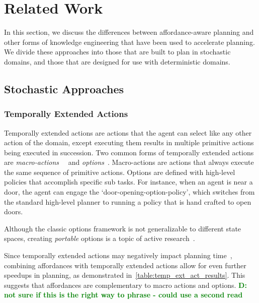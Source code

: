 \documentclass[conference]{IEEEtran}
\newcommand{\dnote}[1]{\textcolor{Green}{\textbf{D: #1}}}
\begin{document}
\section{Related Work}
\label{sec:related-work}

In this section, we discuss the differences between
affordance-aware planning and other forms of knowledge engineering that
have been used to accelerate planning. We divide these approaches
into those that are built to plan in stochastic domains, and those that are
designed for use with deterministic domains.

\subsection{Stochastic Approaches}

\subsubsection{Temporally Extended Actions}
Temporally extended actions are actions that the agent can
select like any other action of the domain, except executing them
results in multiple primitive actions being executed in
succession. Two common forms of temporally extended actions are {\em
  macro-actions}~\cite{hauskrecht98} ~and {\em options}~\cite{sutton99}. 
Macro-actions are actions that always
execute the same sequence of primitive actions. Options are defined
with high-level policies that accomplish specific sub tasks. For
instance, when an agent is near a door, the agent can engage the
`door-opening-option-policy', which switches from the standard
high-level planner to running a policy that is hand crafted to open
doors. 

Although the classic options framework is not generalizable to different state spaces,
creating {\em portable} options is a topic of active research~\cite{konidaris07,konidaris2009efficient,Ravindran03analgebraic,croonenborghs2008learning,andre2002state,konidaris2012transfer}.

Since temporally extended actions may negatively impact planning time~\cite{Jong:2008zr}, combining affordances with temporally extended actions allow for even further speedups in planning, as demonstrated in~\ref{table:temp_ext_act_results}. This suggests that affordances are complementary to macro actions and options. \dnote{not sure if this is the right way to phrase - could use a second read}
\end{document}
